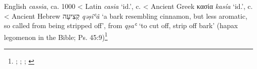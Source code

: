 \begin{etymology}\label{ety:cassia}
English \textit{cassia}, ca. 1000
< Latin \textit{casia} `id.',  c. \AD{}
< Ancient Greek {κασία} \textit{kasía} `id.',  c. \BC{}
< Ancient Hebrew {קְצִיעָה} \textit{qəṣîʿâ} `a bark resembling cinnamon, but less aromatic, so called from being stripped off', from \textit{qṣaʿ} `to cut off, strip off bark' (hapax legomenon in the Bible; Ps. 45:9)\footnote{\textcite[s.v. cassia]{oed}; \textcite{rosol_early_2018}; \textcite[653]{beekes_etymological_2010}; \textcite[589]{klein_comprehensive_1987}}
\end{etymology}